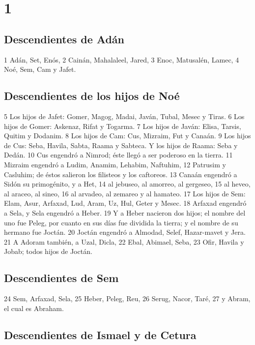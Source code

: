 
\chapter{1}

\section*{Descendientes de Adán}

1 Adán, Set, Enós,
2 Cainán, Mahalaleel, Jared,
3 Enoc, Matusalén, Lamec,
4 Noé, Sem, Cam y Jafet.

\section*{Descendientes de los hijos de Noé}

5 Los hijos de Jafet: Gomer, Magog, Madai, Javán, Tubal, Mesec y Tiras.
6 Los hijos de Gomer: Askenaz, Rifat y Togarma.
7 Los hijos de Javán: Elisa, Tarsis, Quitim y Dodanim.
8 Los hijos de Cam: Cus, Mizraim, Fut y Canaán.
9 Los hijos de Cus: Seba, Havila, Sabta, Raama y Sabteca. Y los hijos de Raama: Seba y Dedán.
10 Cus engendró a Nimrod; éste llegó a ser poderoso en la tierra.
11 Mizraim engendró a Ludim, Anamim, Lehabim, Naftuhim,
12 Patrusim y Casluhim; de éstos salieron los filisteos y los caftoreos.
13 Canaán engendró a Sidón su primogénito, y a Het,
14 al jebuseo, al amorreo, al gergeseo,
15 al heveo, al araceo, al sineo,
16 al arvadeo, al zemareo y al hamateo.
17 Los hijos de Sem: Elam, Asur, Arfaxad, Lud, Aram, Uz, Hul, Geter y Mesec.
18 Arfaxad engendró a Sela, y Sela engendró a Heber.
19 Y a Heber nacieron dos hijos; el nombre del uno fue Peleg, por cuanto en sus días fue dividida la tierra; y el nombre de su hermano fue Joctán.
20 Joctán engendró a Almodad, Selef, Hazar-mavet y Jera.
21 A Adoram también, a Uzal, Dicla,
22 Ebal, Abimael, Seba,
23 Ofir, Havila y Jobab; todos hijos de Joctán.

\section*{Descendientes de Sem}

24 Sem, Arfaxad, Sela,
25 Heber, Peleg, Reu, 
26 Serug, Nacor, Taré,
27 y Abram, el cual es Abraham.

\section*{Descendientes de Ismael y de Cetura}

